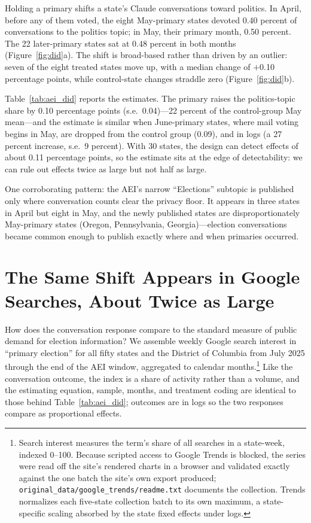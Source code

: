 \documentclass[12pt]{article}
\begin{document}
Holding a primary shifts a state's Claude conversations toward politics. In April, before any of them voted, the eight May-primary states devoted 0.40 percent of conversations to the politics topic; in May, their primary month, 0.50 percent. The 22 later-primary states sat at 0.48 percent in both months (Figure~\ref{fig:did}a). The shift is broad-based rather than driven by an outlier: seven of the eight treated states move up, with a median change of $+$0.10 percentage points, while control-state changes straddle zero (Figure~\ref{fig:did}b).

Table~\ref{tab:aei_did} reports the estimates. The primary raises the politics-topic share by 0.10 percentage points (s.e.\ 0.04)---22 percent of the control-group May mean---and the estimate is similar when June-primary states, where mail voting begins in May, are dropped from the control group (0.09), and in logs (a 27 percent increase, s.e.\ 9 percent). With 30 states, the design can detect effects of about 0.11 percentage points, so the estimate sits at the edge of detectability: we can rule out effects twice as large but not half as large.

One corroborating pattern: the AEI's narrow ``Elections'' subtopic is published only where conversation counts clear the privacy floor. It appears in three states in April but eight in May, and the newly published states are disproportionately May-primary states (Oregon, Pennsylvania, Georgia)---election conversations became common enough to publish exactly where and when primaries occurred.

\section*{The Same Shift Appears in Google Searches, About Twice as Large}

How does the conversation response compare to the standard measure of public demand for election information? We assemble weekly Google search interest in ``primary election'' for all fifty states and the District of Columbia from July 2025 through the end of the AEI window, aggregated to calendar months.\footnote{Search interest measures the term's share of all searches in a state-week, indexed 0--100. Because scripted access to Google Trends is blocked, the series were read off the site's rendered charts in a browser and validated exactly against the one batch the site's own export produced; \texttt{original\_data/google\_trends/readme.txt} documents the collection. Trends normalizes each five-state collection batch to its own maximum, a state-specific scaling absorbed by the state fixed effects under logs.} Like the conversation outcome, the index is a share of activity rather than a volume, and the estimating equation, sample, months, and treatment coding are identical to those behind Table~\ref{tab:aei_did}; outcomes are in logs so the two responses compare as proportional effects.
\end{document}

